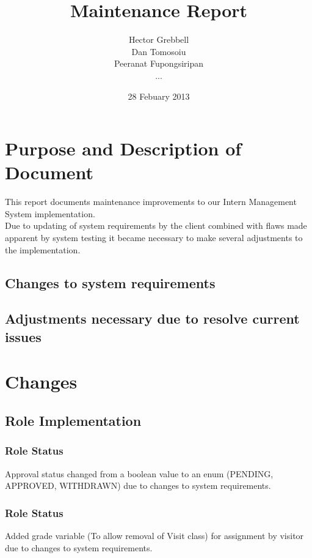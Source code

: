 \documentclass{l3deliverable}
\title{Maintenance Report}
\author{Hector Grebbell \\
        Dan Tomosoiu \\
        Peeranat Fupongsiripan\\
        ...}
\date{28 Febuary 2013}
\begin{document}

\maketitle

\tableofcontents

\newpage


\section{Purpose and Description of Document}
This report documents maintenance improvements to our Intern Management System implementation. \\
Due to updating of system requirements by the client combined with flaws made apparent by system testing it became necessary to make several adjustments to the implementation.\\

\subsection{Changes to system requirements}


\subsection{Adjustments necessary due to resolve current issues}

\section{Changes}

\subsection{Role Implementation}

\subsubsection{Role Status}
Approval status changed from a boolean value to an enum (PENDING, APPROVED, WITHDRAWN) due to changes to system requirements.

\subsubsection{Role Status}
Added grade variable (To allow removal of Visit class) for assignment by visitor due to changes to system requirements.
\end{document}

